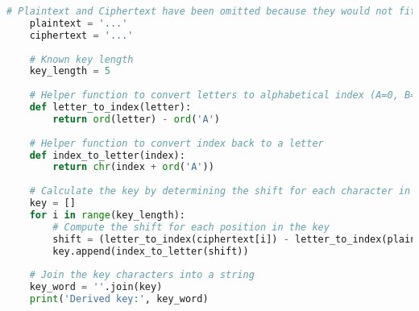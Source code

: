 \vspace*{-0.5cm}
\begin{lstlisting}[language=Python, caption=Python Code to Find Key, label={lst:5.2}]
    # Plaintext and Ciphertext have been omitted because they would not fit in the page.
    plaintext = '...'
    ciphertext = '...'
    
    # Known key length
    key_length = 5
    
    # Helper function to convert letters to alphabetical index (A=0, B=1, ..., Z=25)
    def letter_to_index(letter):
        return ord(letter) - ord('A')
    
    # Helper function to convert index back to a letter
    def index_to_letter(index):
        return chr(index + ord('A'))
    
    # Calculate the key by determining the shift for each character in the key
    key = []
    for i in range(key_length):
        # Compute the shift for each position in the key
        shift = (letter_to_index(ciphertext[i]) - letter_to_index(plaintext[i])) % 26
        key.append(index_to_letter(shift))
    
    # Join the key characters into a string
    key_word = ''.join(key)
    print('Derived key:', key_word)
    
\end{lstlisting}